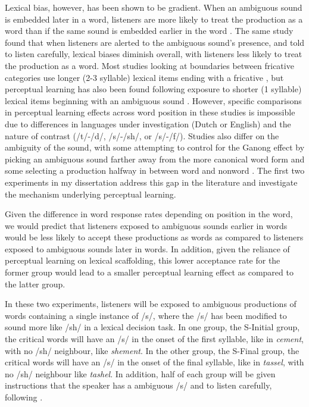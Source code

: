 Lexical bias, however, has been shown to be gradient.  When an ambiguous sound is embedded later in a word, listeners are more likely to treat the production as a word than if the same sound is embedded earlier in the word \citep{Pitt2012}.  The same study found that when listeners are alerted to the ambiguous sound's presence, and told to listen carefully, lexical biases diminish overall, with listeners less likely to treat the production as a word.    Most studies looking at boundaries between fricative categories use longer (2-3 syllable) lexical items ending with a fricative \citep{Norris2003}, but perceptual learning has also been found following exposure to shorter (1 syllable) lexical items beginning with an ambiguous sound \citep{Clare2014}.  However, specific comparisons in perceptual learning effects across word position in these studies is impossible due to differences in languages under investigation (Dutch or English) and the nature of contrast (/t/-/d/, /s/-/sh/, or /s/-/f/). Studies also differ on the ambiguity of the sound, with some attempting to control for the Ganong effect by picking an ambiguous sound farther away from the more canonical word form \citep{Reinisch2013} and some selecting a production halfway in between word and nonword \citep{Norris2003}.  The first two experiments in my dissertation address this gap in the literature and investigate the mechanism underlying perceptual learning.

Given the difference in word response rates depending on position in the word, we would predict that listeners exposed to ambiguous sounds earlier in words would be less likely to accept these productions as words as compared to listeners exposed to ambiguous sounds later in words.  In addition, given the reliance of perceptual learning on lexical scaffolding, this lower acceptance rate for the former group would lead to a smaller perceptual learning effect as compared to the latter group.

In these two experiments, listeners will be exposed to ambiguous productions of words containing a single instance of /s/, where the /s/ has been modified to sound more like /sh/ in a lexical decision task.  In one group, the S-Initial group, the critical words will have an /s/ in the onset of the first syllable, like in \emph{cement}, with no /sh/ neighbour, like \emph{shement}.  In the other group, the S-Final group, the critical words will have an /s/ in the onset of the final syllable, like in \emph{tassel}, with no /sh/ neighbour like \emph{tashel}.  In addition, half of each group will be given instructions that the speaker has a ambiguous /s/ and to listen carefully, following \citet{Pitt2012}.

